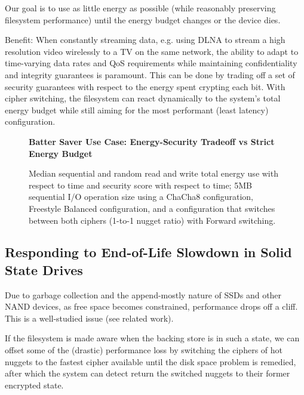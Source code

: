 Our goal is to use as little energy as possible (while reasonably preserving
filesystem performance) until the energy budget changes or the device dies.

Benefit: When constantly streaming data, e.g. using DLNA to stream a high
resolution video wirelessly to a TV on the same network, the ability to adapt to
time-varying data rates and QoS requirements while maintaining confidentiality
and integrity guarantees is paramount. This can be done by trading off a set of
security guarantees with respect to the energy spent crypting each bit. With
cipher switching, the filesystem can react dynamically to the system's total
energy budget while still aiming for the most performant (least latency)
configuration.


\begin{figure}[ht] \textbf{Batter Saver Use Case: Energy-Security Tradeoff vs
   Strict Energy Budget}\par\medskip
   \centering
   {} \caption{Median sequential and random
   read and write total energy use with respect to time and security score with
   respect to time; 5MB sequential I/O operation size using a ChaCha8
   configuration, Freestyle Balanced configuration, and a configuration that
   switches between both ciphers (1-to-1 nugget ratio) with Forward switching.}
  \label{fig:usecase-battery}
\end{figure}

\subsection{Responding to End-of-Life Slowdown in Solid State Drives}

Due to garbage collection and the append-mostly nature of SSDs and other NAND
devices, as free space becomes constrained, performance drops off a cliff. This
is a well-studied issue (see related work).

If the filesystem is made aware when the backing store is in such a state, we
can offset some of the (drastic) performance loss by switching the ciphers of
hot nuggets to the fastest cipher available until the disk space problem is
remedied, after which the system can detect return the switched nuggets to their
former encrypted state.

